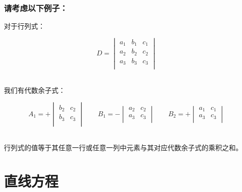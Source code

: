 \documentclass[UTF8]{ctexart}
\begin{document}
    \subsubsection*{请考虑以下例子：}
    对于行列式：
    \begin{large}
        \begin{equation*}
            D=
            \begin{vmatrix}
                a_1&b_1&c_1\\
                a_2&b_2&c_2\\
                a_3&b_3&c_3\\
            \end{vmatrix}
        \end{equation*}
    \end{large}\\
    我们有代数余子式：\vspace{5pt}
    \begin{large}
        \begin{equation*}
            A_1=+
            \begin{vmatrix}
                b_2&c_2\\
                b_3&c_3\\
            \end{vmatrix}\qquad
            B_1=-
            \begin{vmatrix}
                a_2&c_2\\
                a_3&c_3\\
            \end{vmatrix}\qquad
            B_2=+
            \begin{vmatrix}
                a_1&c_1\\
                a_3&c_3\\
            \end{vmatrix}
        \end{equation*}
    \end{large}\\[2mm]
    行列式的值等于其任意一行或任意一列中元素与其对应代数余子式的乘积之和。\\

\newpage

\section{直线方程}
\end{document}
